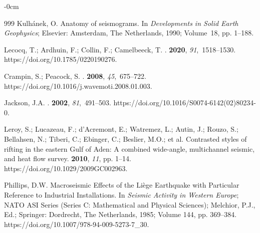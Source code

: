 \documentclass[sensors,article,accept,moreauthors,pdftex]{Definitions/mdpi}
\begin{document}
\begin{adjustwidth}{-\extralength}{0cm}
\begin{thebibliography}{999}
Kulhánek, O. Anatomy of seismograms.
\newblock In {\em Developments in Solid Earth Geophysics}; Elsevier: Amsterdam,
  The Netherlands,  1990; Volume~18, pp. 1--188.

Lecocq, T.; Ardhuin, F.; Collin, F.; Camelbeeck, T.
.
 {\bf 2020}, {\em
  91},~1518--1530.
\newblock
{https://doi.org/10.1785/0220190276}.

Crampin, S.; Peacock, S.
.
 {\bf 2008}, {\em 45},~675--722.
\newblock
 {https://doi.org/10.1016/j.wavemoti.2008.01.003}.

Jackson, J.A.
.
 {\bf 2002}, {\em 81},~491--503.
\newblock %
{https://doi.org/10.1016/S0074-6142(02)80234-0}.

Leroy, S.; Lucazeau, F.; d'Acremont, E.; Watremez, L.; Autin, J.; Rouzo, S.;
  Bellahsen, N.; Tiberi, C.; Ebinger, C.; Beslier, M.O.; et al.
\newblock Contrasted styles of rifting in the eastern Gulf of Aden: A combined
  wide-angle, multichannel seismic, and heat flow survey.
 {\bf 2010}, {\em 11}, pp. 1--14. %
{https://doi.org/10.1029/2009GC002963}.

Phillips, D.W.
\newblock Macroseismic Effects of the Liège Earthquake with Particular
  Reference to Industrial Installations. In {\em Seismic Activity in Western
  Europe}; NATO ASI Series (Series C: Mathematical and Physical Sciences);
  Melchior, P.J., Ed.; Springer: Dordrecht, The Netherlands,  1985; Volume 144, pp.
  369--384.
\newblock
{https://doi.org/10.1007/978-94-009-5273-7\_30}.


\end{thebibliography}
\end{adjustwidth}
\end{document}
